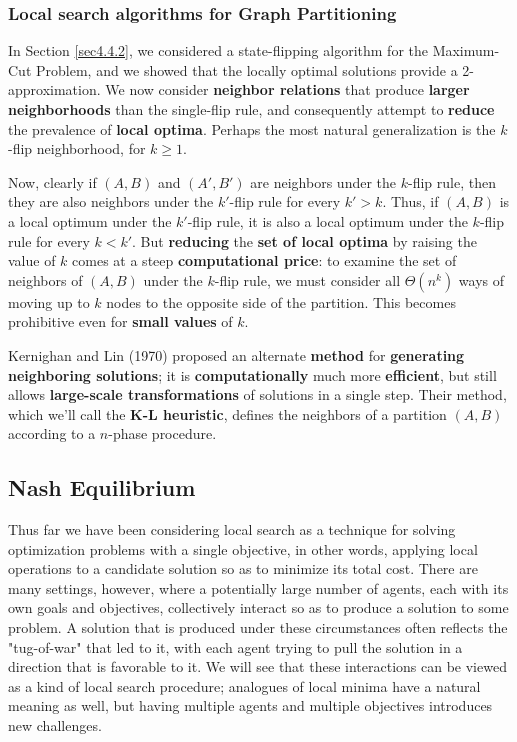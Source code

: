 \subsubsection{Local search algorithms for Graph Partitioning}
In Section \ref{sec4.4.2}, we considered a state-flipping algorithm for the Maximum-Cut Problem, and we showed that the locally optimal solutions provide a 2-approximation. We now consider \textbf{neighbor relations} that produce \textbf{larger neighborhoods} than the single-flip rule, and consequently attempt to \textbf{reduce} the prevalence of \textbf{local optima}. Perhaps the most natural generalization is the $k$-flip neighborhood, for $k \geq 1$.


Now, clearly if $(A, B)$ and $(A', B')$ are neighbors under the $k$-flip rule, then they are also neighbors under the $k'$-flip rule for every $k' > k$. Thus, if $(A, B)$ is a local optimum under the $k'$-flip rule, it is also a local optimum under the $k$-flip rule for every $k < k'$. But \textbf{reducing} the \textbf{set of local optima} by raising the value of $k$ comes at a steep \textbf{computational price}: to examine the set of neighbors of $(A, B)$ under the $k$-flip rule, we must consider all $\Theta(n^k)$ ways of moving up to $k$ nodes to the opposite side of the partition. This becomes prohibitive even for \textbf{small values} of $k$. 

Kernighan and Lin (1970) proposed an alternate \textbf{method} for \textbf{generating neighboring solutions}; it is \textbf{computationally} much more \textbf{efficient}, but still allows \textbf{large-scale transformations} of solutions in a single step. Their method, which we’ll call the \textbf{K-L heuristic}, defines the neighbors of a partition $(A, B)$ according to a $n$-phase procedure.

\subsection{Nash Equilibrium}
Thus far we have been considering local search as a technique for solving optimization problems with a single objective, in other words, applying local operations to a candidate solution so as to minimize its total cost. There are many settings, however, where a potentially large number of agents, each with its own goals and objectives, collectively interact so as to produce a solution to some problem. A solution that is produced under these circumstances often reflects the "tug-of-war" that led to it, with each agent trying to pull the solution in a direction that is favorable to it. We will see that these interactions can be viewed as a kind of local search procedure; analogues of local minima have a natural meaning as well, but having multiple agents and multiple objectives introduces new challenges. 

